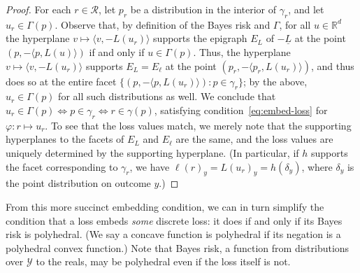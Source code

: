 \documentclass[12pt]{article}
\newcommand{\Comments}{1}
\newcommand{\mytodo}[2]{\ifnum\Comments=1%
  \todo[linecolor=#1!80!black,backgroundcolor=#1,bordercolor=#1!80!black]{#2}\fi}
\newcommand{\btw}[1]{}%
\newcommand{\reals}{\mathbb{R}}
\newcommand{\R}{\mathcal{R}}
\newcommand{\Y}{\mathcal{Y}}
\newcommand{\risk}[1]{\underline{#1}}
\newcommand{\inprod}[2]{\langle #1, #2 \rangle}%
\DeclareMathOperator*{\sgn}{sgn}
\begin{document}
\begin{proof}
  For each $r\in\R$, let $p_r$ be a distribution in the interior of $\gamma_r$, and let $u_r \in \Gamma(p)$.
  Observe that, by definition of the Bayes risk and $\Gamma$, for all $u\in\reals^d$ the hyperplane $v \mapsto \inprod{v}{-L(u_r)}$ supports the epigraph $E_L$ of $-\risk{L}$ at the point $(p,-\inprod{p}{L(u)})$ if and only if $u\in\Gamma(p)$.
  Thus, the hyperplane $v \mapsto \inprod{v}{-L(u_r)}$ supports $E_L = E_\ell$ at the point $(p_r,-\inprod{p_r}{L(u_r)})$, and thus does so at the entire facet $\{(p,-\inprod{p}{L(u_r)}) : p\in\gamma_r\}$; by the above, $u_r \in \Gamma(p)$ for all such distributions as well.
  We conclude that $u_r \in \Gamma(p) \iff p \in \gamma_r \iff r \in \gamma(p)$, satisfying condition~\eqref{eq:embed-loss} for $\varphi : r \mapsto u_r$.
  To see that the loss values match, we merely note that the supporting hyperplanes to the facets of $E_L$ and $E_\ell$ are the same, and the loss values are uniquely determined by the supporting hyperplane.
  (In particular, if $h$ supports the facet corresponding to $\gamma_r$, we have $\ell(r)_y = L(u_r)_y = h(\delta_y)$, where $\delta_y$ is the point distribution on outcome $y$.)
\end{proof}

\btw{RF: matching risks is not necessary for \emph{consistency}, as evidenced by logistic loss for 0-1 loss.  Maybe we should just make the observation, earlier on, that \emph{embedding} is not necessary for consistency.}
\btw{RF: DKR (section 3.1) realized the importance of matching Bayes risks, but they could only give general results for strictly convex (concave I should say) risks, in part because they fixed the link function to be a generalization of $\sgn$.  In contrast, we focus exclusively on non-strictly-convex risks.}

From this more succinct embedding condition, we can in turn simplify the condition that a loss embeds \emph{some} discrete loss: it does if and only if its Bayes risk is polyhedral.
(We say a concave function is polyhedral if its negation is a polyhedral convex function.)
Note that Bayes risk, a function from distributions over $\Y$ to the reals, may be polyhedral even if the loss itself is not.
\end{document}
